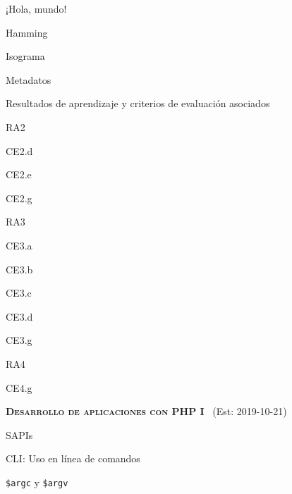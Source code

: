 \begin{longenum}
\begin{longenum}
        \begin{longenum}
            \item ¡Hola, mundo!
            \item Hamming
            \item Isograma
        \end{longenum}
        \item Metadatos
        \begin{longenum}
            \item Resultados de aprendizaje y criterios de evaluación asociados
            \begin{longenum}
                \item RA2
                \begin{longenum}
                    \item CE2.d
                    \item CE2.e
                    \item CE2.g
                \end{longenum}
                \item RA3
                \begin{longenum}
                    \item CE3.a
                    \item CE3.b
                    \item CE3.c
                    \item CE3.d
                    \item CE3.g
                \end{longenum}
                \item RA4
                \begin{longenum}
                    \item CE4.g
                \end{longenum}
            \end{longenum}
        \end{longenum}
    \end{longenum}
    \item \textbf{\textsc{Desarrollo de aplicaciones con PHP I}} \ (Est: 2019-10-21)
    \begin{longenum}
        \item SAPIs
        \begin{longenum}
            \item CLI: Uso en línea de comandos
            \begin{longenum}
                \item \texttt{\$argc} y \texttt{\$argv}

\end{longenum}
\end{longenum}
\end{longenum}
\end{longenum}
